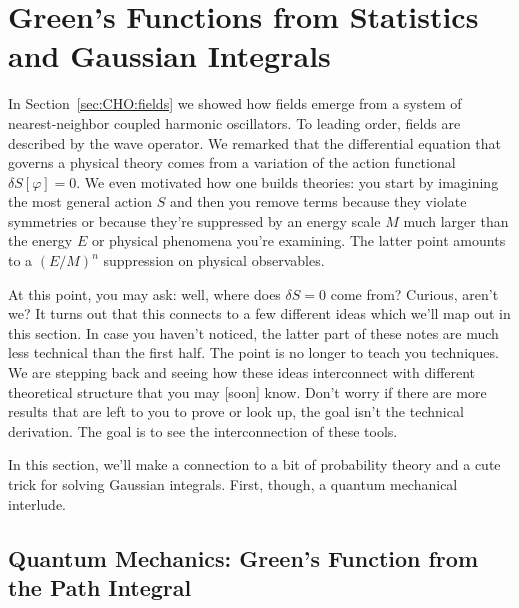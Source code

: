 \section{Green's Functions from Statistics and Gaussian Integrals}

In Section~\ref{sec:CHO:fields} we showed how fields emerge from a system of nearest-neighbor coupled harmonic oscillators. To leading order, fields are described by the wave operator. We remarked that the differential equation that governs a physical theory comes from a variation of the action functional $\delta S[\varphi]=0$. We even motivated how one builds theories: you start by imagining the most general action $S$ and then you remove terms because they violate symmetries or because they're suppressed by an energy scale $M$ much larger than the energy $E$ or physical phenomena you're examining. The latter point amounts to a $(E/M)^n$ suppression on physical observables. 

At this point, you may ask: well, where does $\delta S = 0$ come from? Curious, aren't we? It turns out that this connects to a few different ideas which we'll map out in this section. In case you haven't noticed, the latter part of these notes are much less technical than the first half. The point is no longer to teach you techniques. We are stepping back and seeing how these ideas interconnect with different theoretical structure that you may [soon] know. Don't worry if there are more results that are left to you to prove or look up, the goal isn't the technical derivation. The goal is to see the interconnection of these tools.

In this section, we'll make a connection to a bit of probability theory and a cute trick for solving Gaussian integrals. First, though, a quantum mechanical interlude.

\subsection{Quantum Mechanics: Green's Function from the Path Integral}

